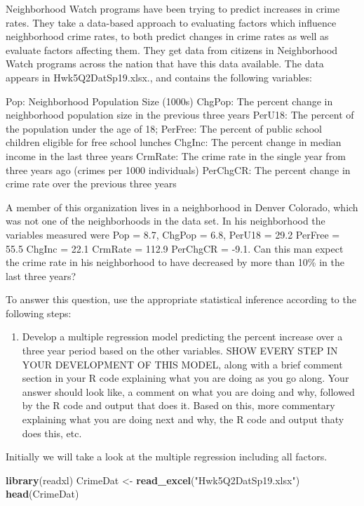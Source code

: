 \documentclass[]{article}
\newenvironment{Shaded}{\begin{snugshade}}{\end{snugshade}}
\newcommand{\KeywordTok}[1]{\textcolor[rgb]{0.13,0.29,0.53}{\textbf{#1}}}
\newcommand{\StringTok}[1]{\textcolor[rgb]{0.31,0.60,0.02}{#1}}
\newcommand{\NormalTok}[1]{#1}
\providecommand{\tightlist}{%
  \setlength{\itemsep}{0pt}\setlength{\parskip}{0pt}}
\begin{document}
Neighborhood Watch programs have been trying to predict increases in
crime rates. They take a data-based approach to evaluating factors which
influence neighborhood crime rates, to both predict changes in crime
rates as well as evaluate factors affecting them. They get data from
citizens in Neighborhood Watch programs across the nation that have this
data available. The data appears in Hwk5Q2DatSp19.xlsx., and contains
the following variables:

Pop: Neighborhood Population Size (1000s) ChgPop: The percent change in
neighborhood population size in the previous three years PerU18: The
percent of the population under the age of 18; PerFree: The percent of
public school children eligible for free school lunches ChgInc: The
percent change in median income in the last three years CrmRate: The
crime rate in the single year from three years ago (crimes per 1000
individuals) PerChgCR: The percent change in crime rate over the
previous three years

A member of this organization lives in a neighborhood in Denver
Colorado, which was not one of the neighborhoods in the data set. In his
neighborhood the variables measured were Pop = 8.7, ChgPop = 6.8, PerU18
= 29.2 PerFree = 55.5 ChgInc = 22.1 CrmRate = 112.9 PerChgCR = -9.1. Can
this man expect the crime rate in his neighborhood to have decreased by
more than 10\% in the last three years?

To answer this question, use the appropriate statistical inference
according to the following steps:

\begin{enumerate}
\def\labelenumi{\Alph{enumi})}
\tightlist
\item
  Develop a multiple regression model predicting the percent increase
  over a three year period based on the other variables. SHOW EVERY STEP
  IN YOUR DEVELOPMENT OF THIS MODEL, along with a brief comment section
  in your R code explaining what you are doing as you go along. Your
  answer should look like, a comment on what you are doing and why,
  followed by the R code and output that does it. Based on this, more
  commentary explaining what you are doing next and why, the R code and
  output thaty does this, etc.
\end{enumerate}

Initially we will take a look at the multiple regression including all
factors.

\begin{Shaded}
\begin{Highlighting}[]
\KeywordTok{library}\NormalTok{(readxl)}
\NormalTok{CrimeDat <-}\StringTok{ }\KeywordTok{read_excel}\NormalTok{(}\StringTok{"Hwk5Q2DatSp19.xlsx"}\NormalTok{)}
\KeywordTok{head}\NormalTok{(CrimeDat)}
\end{Highlighting}
\end{Shaded}
\end{document}
